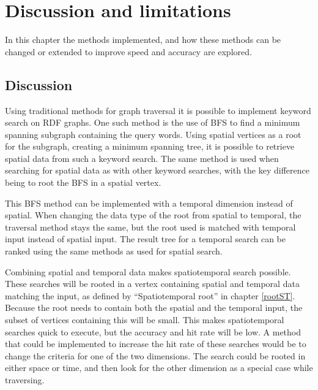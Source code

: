 \chapter{Discussion and limitations}
\label{cha:Discussion}
In this chapter the methods implemented, and how these methods can be changed or extended to improve speed and accuracy are explored.

\section{Discussion}
\label{sec:Discussion}
Using traditional methods for graph traversal it is possible to implement keyword search on RDF graphs. One such method is the use of BFS to find a minimum spanning subgraph containing the query words. Using spatial vertices as a root for the subgraph, creating a minimum spanning tree, it is possible to retrieve spatial data from such a keyword search. The same method is used when searching for spatial data as with other keyword searches, with the key difference being to root the BFS in a spatial vertex.

This BFS method can be implemented with a temporal dimension instead of spatial. When changing the data type of the root from spatial to temporal, the traversal method stays the same, but the root used is matched with temporal input instead of spatial input. The result tree for a temporal search can be ranked using the same methods as used for spatial search.

Combining spatial and temporal data makes spatiotemporal search possible. These searches will be rooted in a vertex containing spatial and temporal data matching the input, as defined by ``Spatiotemporal root'' in chapter \ref{rootST}. Because the root needs to contain both the spatial and the temporal input, the subset of vertices containing this will be small. This makes spatiotemporal searches quick to execute, but the accuracy and hit rate will be low. A method that could be implemented to increase the hit rate of these searches would be to change the criteria for one of the two dimensions. The search could be rooted in either space or time, and then look for the other dimension as a special case while traversing.

